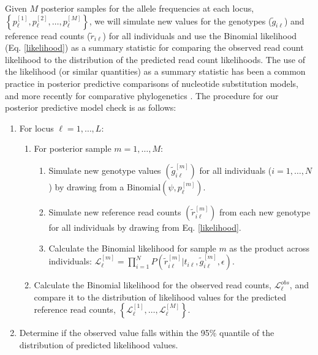 \documentclass[11pt,english,letterpaper,oneside]{article}
\begin{document}
Given $M$ posterior samples for the allele frequencies at each locus, $\left\{p_{\ell}^{[1]},p_{\ell}^{[2]},\ldots,p_{\ell}^{[M]} \right\}$, we will simulate new values for the genotypes ($\tilde{g}_{i \ell}$) and reference read counts ($\tilde{r}_{i \ell}$) for all individuals and use the Binomial likelihood (Eq. \ref{likelihood}) as a summary statistic for comparing the observed read count likelihood to the distribution of the predicted read count likelihoods. The use of the likelihood (or similar quantities) as a summary statistic has been a common practice in posterior predictive comparisons of nucleotide substitution models, and more recently for comparative phylogenetics \citep{ripplinger2010DNAmodels,reid2014poorfit,pennell2015adequacy}. The procedure for our posterior predictive model check is as follows:
\medskip

\begin{enumerate}
  \item For locus $\ell = 1,\ldots,L$:
  \begin{enumerate}[label={\arabic{enumi}.\arabic*.}]
    \item For posterior sample $m = 1,\ldots,M$:
    \begin{enumerate}[label={\arabic{enumi}.\arabic{enumi}.\arabic*.}]
      \item Simulate new genotype values $\left( \tilde{g}_{i \ell}^{[m]}\right)$ for all individuals ($i = 1,\ldots,N$) by drawing from a $\text{Binomial}\left( \psi,p_{\ell}^{[m]} \right)$.
      \item Simulate new reference read counts $\left( \tilde{r}_{i \ell}^{[m]} \right)$ from each new genotype for all individuals by drawing from Eq. \ref{likelihood}.
      \item Calculate the Binomial likelihood for sample $m$ as the product across individuals: $\mathcal{L}_{\ell}^{[m]} = \prod_{i=1}^{N}P\left(\tilde{r}_{i \ell}^{[m]} | t_{i \ell},\tilde{g}_{i \ell}^{[m]},\epsilon\right)$.
    \end{enumerate}
    \item Calculate the Binomial likelihood for the observed read counts, $\mathcal{L}_{\ell}^{obs}$, and compare it to the distribution of likelihood values for the predicted reference read counts, $\left\{ \mathcal{L}_{\ell}^{[1]},\ldots,\mathcal{L}_{\ell}^{[M]}\right\}$.
\end{enumerate}
\item Determine if the observed value falls within the 95\% quantile of the distribution of predicted likelihood values.
\end{enumerate}
\medskip
\end{document}
